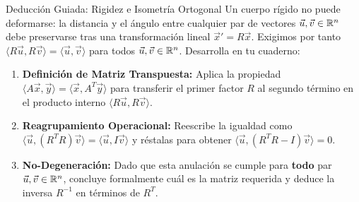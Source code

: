 \documentclass[10pt,aspectratio=169]{beamer}
\begin{document}
\begin{frame}{Deducción Guiada: Rigidez e Isometría Ortogonal}
  \vspace{0.05cm}
  Un cuerpo rígido no puede deformarse: la distancia y el ángulo entre cualquier par de vectores $\vec{u}, \vec{v} \in \mathbb{R}^n$ debe preservarse tras una transformación lineal $\vec{x}' = R\vec{x}$. Exigimos por tanto $\langle R\vec{u}, R\vec{v} \rangle = \langle \vec{u}, \vec{v} \rangle$ para todos $\vec{u}, \vec{v} \in \mathbb{R}^n$. Desarrolla en tu cuaderno:
  \vspace{0.22cm}
  \begin{enumerate}\itemsep10pt
    \item[(a)] \textbf{Definición de Matriz Transpuesta:} Aplica la propiedad $\langle A\vec{x}, \vec{y} \rangle = \langle \vec{x}, A^T\vec{y} \rangle$ para transferir el primer factor $R$ al segundo término en el producto interno $\langle R\vec{u}, R\vec{v} \rangle$.
    \item[(b)] \textbf{Reagrupamiento Operacional:} Reescribe la igualdad como $\langle \vec{u}, (R^T R)\vec{v} \rangle = \langle \vec{u}, I\vec{v} \rangle$ y réstalas para obtener $\langle \vec{u}, (R^T R - I)\vec{v} \rangle = 0$.
    \item[(c)] \textbf{No-Degeneración:} Dado que esta anulación se cumple para \textbf{todo} par $\vec{u}, \vec{v} \in \mathbb{R}^n$, concluye formalmente cuál es la matriz requerida y deduce la inversa $R^{-1}$ en términos de $R^T$.
  \end{enumerate}
\end{frame}
\end{document}
